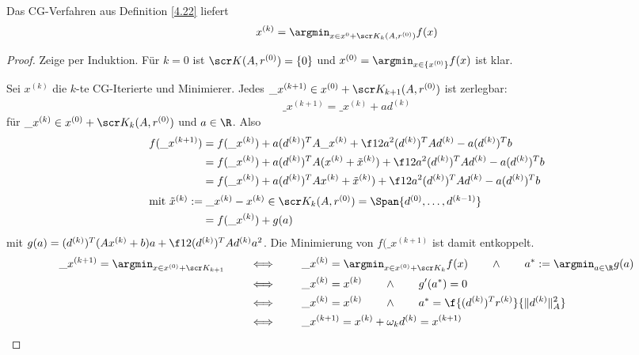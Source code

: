 \documentclass[11pt]{scrbook}
\begin{document}
\begin{st} \label{4.23}
	Das CG-Verfahren aus Definition \ref{4.22} liefert
	\[
		x^{(k)} = \argmin_{x \in x^{0} + \scr K_k(A, r^{(0)})} f(x)
	\]
	\begin{proof}
		Zeige per Induktion.
		Für $k=0$ ist $\scr K(A, r^{(0)}) = \{0\}$ und $x^{(0)} = \argmin_{x \in \{x^{(0)}\}} f(x)$ ist klar.

		Sei $x^{(k)}$ die $k$-te CG-Iterierte und Minimierer.
		Jedes $\_x^{(k+1)} \in x^{(0)} + \scr K_{k+1}(A, r^{(0)})$ ist zerlegbar:
		\begin{align*}
			\_x^{(k+1)} = \_x^{(k)} + ad^{(k)} 
		\end{align*}
		für $\_x^{(k)} \in x^{(0)} + \scr K_k (A, r^{(0)})$ und $a \in \R$.
		Also
		\begin{align*}
			f(\_x^{(k+1)}) 
			&= f(\_x^{(k)}) + a(d^{(k)})^T A \_x^{(k)} + \f 12 a^2 (d^{(k)})^T A d^{(k)} - a(d^{(k)})^T b \\
			&= f(\_x^{(k)}) + a(d^{(k)})^T A (x^{(k)} + \tilde x^{(k)}) + \f 12 a^2 (d^{(k)})^T A d^{(k)} - a(d^{(k)})^T b \\
			&= f(\_x^{(k)}) + a (d^{(k)})^T A x^{(k)} + \tilde x^{(k)}) + \f 12 a^2 (d^{(k)})^T A d^{(k)} - a(d^{(k)})^T b \\
			\intertext{mit $\tilde x^{(k)} := \_x^{(k)}- x^{(k)} \in \scr K_k(A, r^{(0)}) = \Span \{d^{(0)}, \dotsc, d^{(k-1)}\}$}
			&= f(\_x^{(k)}) + g(a)
		\end{align*}
		mit $g(a) = (d^{(k)})^T (Ax^{(k)} + b)a + \f 12 (d^{(k)})^T A d^{(k)} a^2$.
		Die Minimierung von $f(\_x^{(k+1)}$ ist damit entkoppelt.
		\begin{align*}
			\_x^{(k+1)} = \argmin_{x\in x^{(0)} + \scr K_{k+1}}
			\qquad &\iff \qquad \_x^{(k)} = \argmin_{x \in x^{(0)} + \scr K_k} f(x) \qquad\land\qquad a^* := \argmin_{a\in \R} g(a) \\
			\qquad &\iff \qquad \_x^{(k)} = x^{(k)} \qquad \land \qquad g'(a^*) = 0 \\
			\qquad &\iff \qquad \_x^{(k)} = x^{(k)} \qquad \land \qquad a^* = \f {(d^{(k)})^T r^{(k)}}{\|d^{(k)}\|_A^2} \\
			\qquad &\iff \qquad \_x^{(k+1)} = x^{(k)}  + \omega_k d^{(k)} = x^{(k+1)}
		\end{align*}
	\end{proof}
\end{st}
\end{document}
